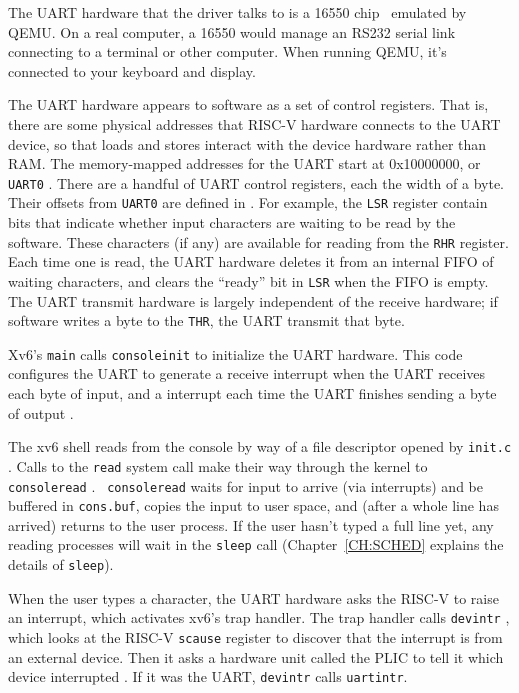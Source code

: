 The UART hardware that the driver talks to is a 16550
chip~\cite{ns16550a} emulated by QEMU. On a real computer, a 16550
would manage an RS232 serial link connecting to a terminal or other
computer. When running QEMU, it's connected to your keyboard and
display.

The UART hardware appears to software as a set of 
control registers. That is, there are some physical addresses that 
RISC-V hardware connects to the UART device, so that loads and stores
interact with the device hardware rather than RAM.
The memory-mapped addresses for the UART start at 0x10000000, or {\tt UART0}
.
There are a handful of UART control registers, each the width
of a byte. Their offsets from {\tt UART0} are defined in
. For example, the
{\tt LSR} register contain bits that indicate whether input
characters are waiting to be read by the software. These
characters (if any) are available for reading from the
{\tt RHR} register. Each time one is read, the UART hardware
deletes it from an internal FIFO of waiting characters, and
clears the ``ready'' bit in {\tt LSR} when the FIFO is empty.
The UART transmit hardware is largely independent of the receive
hardware; if software writes a byte to the {\tt THR},
the UART transmit that byte.

Xv6's {\tt main} calls {\tt consoleinit}
 to initialize the UART
hardware. This code configures the UART to generate 
a receive 
interrupt when the UART receives each byte of input, and
a  interrupt each time the
UART finishes sending a byte of output .

The xv6 shell reads from the console by way of a file descriptor
opened by {\tt init.c} . Calls to
the {\tt read} system call make their way through the kernel to {\tt
  consoleread} . {\tt
  consoleread} waits for input to arrive (via interrupts) and be
buffered in {\tt cons.buf}, copies the input to user space, and (after
a whole line has arrived) returns to the user process. If the user
hasn't typed a full line yet, any reading processes will wait in the
{\tt sleep} call
(Chapter~\ref{CH:SCHED} explains the details of {\tt sleep}).

When the user types a character, the UART hardware asks the RISC-V
to raise an interrupt, which activates
xv6's trap handler.
The trap handler calls {\tt devintr}
,
which looks at the RISC-V {\tt scause} register to discover that
the interrupt is from an external device.
Then it asks a hardware unit called the PLIC
\cite{riscv:priv}
to tell it which device interrupted
.
If it was the UART, {\tt devintr} calls {\tt uartintr}.

